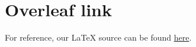 \documentclass[11pt,sigconf,nonacm]{acmart}
\begin{document}










\section{Overleaf link}
For reference, our LaTeX source can be found \href{https://www.overleaf.com/project/6b0499d40bcb0b93df7e83e1/share#f5b1bafdbf04bc691c6747c21540f1d2ac439629964ca6a0}{\color{darkblue}here}.



\end{document}
